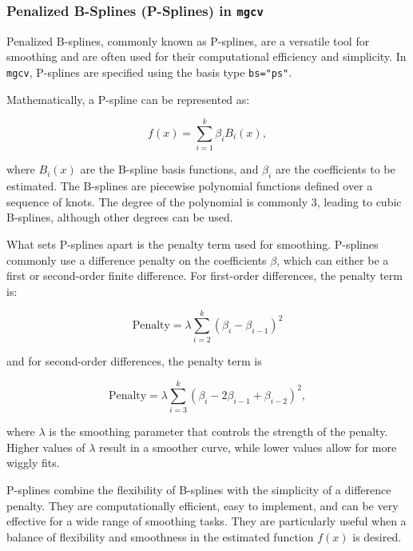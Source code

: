 \subsubsection{Penalized B-Splines (P-Splines) in \texttt{mgcv}}

Penalized B-splines, commonly known as P-splines, are a versatile tool for smoothing and are often used for their computational efficiency and simplicity. In \texttt{mgcv}, P-splines are specified using the basis type \texttt{bs="ps"}.

Mathematically, a P-spline can be represented as:

\begin{equation}
    f(x) = \sum_{i=1}^{k} \beta_i B_i(x),
    \label{eq:ps_splines}
\end{equation}

where \(B_i(x)\) are the B-spline basis functions, and \(\beta_i\) are the coefficients to be estimated. The B-splines are piecewise polynomial functions defined over a sequence of knots. The degree of the polynomial is commonly 3, leading to cubic B-splines, although other degrees can be used.
\newline

What sets P-splines apart is the penalty term used for smoothing. P-splines commonly use a difference penalty on the coefficients \(\beta\), which can either be a first or second-order finite difference. For first-order differences, the penalty term is:

\begin{equation}
    \text{Penalty} = \lambda \sum_{i=2}^{k} (\beta_i - \beta_{i-1})^2
    \label{1st_order_penalty,}
\end{equation}

and for second-order differences, the penalty term is

\[
\text{Penalty} = \lambda \sum_{i=3}^{k} (\beta_i - 2\beta_{i-1} + \beta_{i-2})^2,
\]

where \(\lambda\) is the smoothing parameter that controls the strength of the penalty. Higher values of \(\lambda\) result in a smoother curve, while lower values allow for more wiggly fits.




P-splines combine the flexibility of B-splines with the simplicity of a difference penalty. They are computationally efficient, easy to implement, and can be very effective for a wide range of smoothing tasks. They are particularly useful when a balance of flexibility and smoothness in the estimated function \(f(x)\) is desired.





